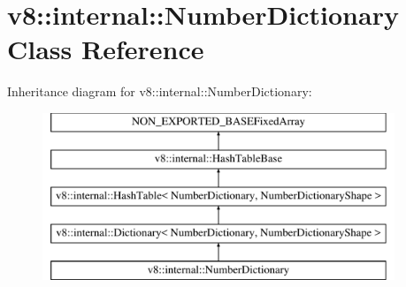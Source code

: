 \hypertarget{classv8_1_1internal_1_1NumberDictionary}{}\section{v8\+:\+:internal\+:\+:Number\+Dictionary Class Reference}
\label{classv8_1_1internal_1_1NumberDictionary}
Inheritance diagram for v8\+:\+:internal\+:\+:Number\+Dictionary\+:\begin{figure}[H]
\begin{center}
\leavevmode
\includegraphics[height=5.000000cm]{classv8_1_1internal_1_1NumberDictionary}
\end{center}
\end{figure}
